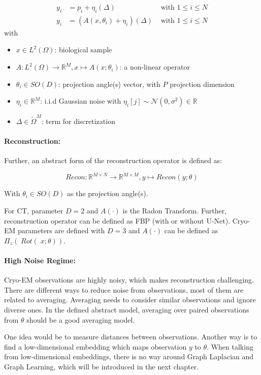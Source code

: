 \begin{equation}
    \label{eq:abstract-model}
    \begin{aligned}
        y_i &= p_i + \eta_i (\Delta) & \text{ with } 1 \leq i \leq N \\
        y_i &= \left( A(x, \theta_i) + \eta_i \right) (\Delta) & \text{ with } 1 \leq i \leq N 
    \end{aligned}
\end{equation}
with
\begin{itemize}
    \item $x \in L^2(\Omega)$: biological sample
    \item $A: L^2(\Omega) \to \mathbb{R}^M, x \mapsto A(x; \theta_i)$: a non-linear operator 
    \item $\theta_i \in SO(D)$: projection angle(s) vector, with $P$ projection dimension
    \item $\eta_i \in \mathbb{R}^M$: i.i.d Gaussian noise with $\eta_i[j] \sim \mathcal{N}(0,\sigma^2) \in \mathbb{R}$
    \item $\Delta \in \tilde{\Omega}^{M}$: term for discretization
\end{itemize}

\paragraph{Reconstruction:}

Further, an abstract form of the reconstruction operator is defined as:

\begin{equation}
    \textit{Recon} : \mathbb{R}^{M \times N} \to \mathbb{R}^{M \times M}, y \mapsto Recon(y; \theta)
\end{equation}

With $\theta_i \in SO(D)$ as the projection angle(s).

For CT, parameter $D=2$ and $A(\cdot)$ is the Radon Transform.
Further, reconstruction operator can be defined as FBP (with or without U-Net).
Cryo-EM parameters are defined with $D=3$ and $A(\cdot)$ can be
defined as $\Pi_z \left(\; \textit{Rot}(\;x; \theta) \right)$. 


\paragraph{High Noise Regime:}
Cryo-EM observations are highly noisy, which makes reconstruction challenging. 
There are different ways to reduce noise from observations, most of them are related to averaging. 
Averaging needs to consider similar observations and ignore diverse ones. 
In the defined abstract model, averaging over paired observations from $\theta$ should be a good averaging model.

One idea would be to measure distances between observations.
Another way is to find a low-dimensional embedding which maps observation $y$ to $\theta$.
When talking from low-dimensional embeddings, there is no way around Graph Laplacian and Graph Learning,
which will be introduced in the next chapter.

